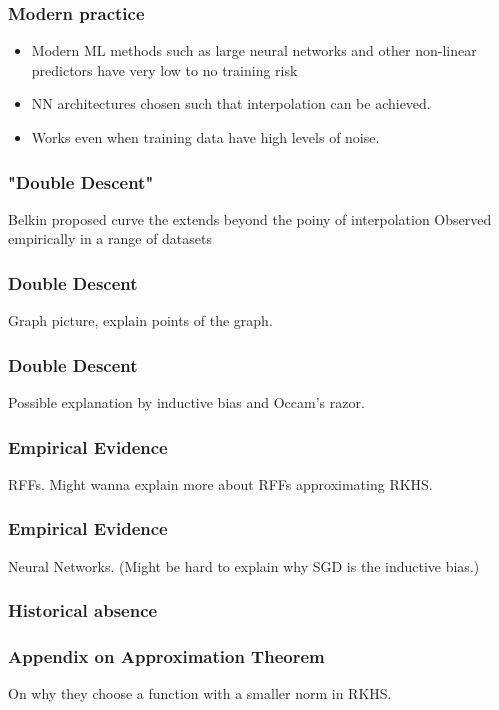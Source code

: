 \documentclass{beamer}
\begin{document}
\begin{frame}
\frametitle{Modern practice}
\begin{itemize}
	\item Modern ML methods such as large neural networks and other non-linear predictors have very low to no training risk
	\item NN architectures chosen such that interpolation can be achieved.
	\item Works even when training data have high levels of noise.
\end{itemize}
\end{frame}

\begin{frame}
\frametitle{"Double Descent"}
Belkin proposed curve the extends beyond the poiny of interpolation
Observed empirically in a range of datasets
\end{frame}

\begin{frame}
\frametitle{Double Descent}
Graph picture, explain points of the graph.
\end{frame}

\begin{frame}
\frametitle{Double Descent}
Possible explanation by inductive bias and Occam's razor.
\end{frame}

\begin{frame}
\frametitle{Empirical Evidence}
RFFs. Might wanna explain more about RFFs approximating RKHS.
\end{frame}

\begin{frame}
\frametitle{Empirical Evidence}
Neural Networks. (Might be hard to explain why SGD is the inductive bias.)
\end{frame}

\begin{frame}
\frametitle{Historical absence}

\end{frame}

\begin{frame}
\frametitle{Appendix on Approximation Theorem}
On why they choose a function with a smaller norm in RKHS.
\end{frame}
\end{document}

